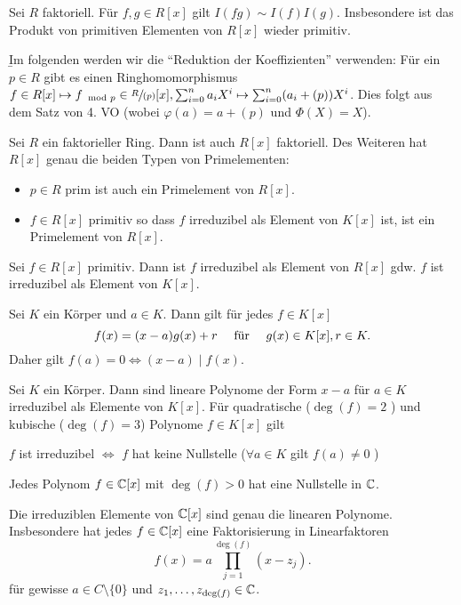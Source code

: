 \begin{proposition}[Gauss]
	Sei $R$ faktoriell. Für $f,g \in R[x]$ gilt $I(fg) \sim I(f) I(g)$.
	Insbesondere ist das Produkt von primitiven Elementen von $R[x]$ wieder primitiv.
\end{proposition}

\b
Im folgenden werden wir die \enquote{Reduktion der Koeffizienten} verwenden:
Für ein $p \in R$ gibt es einen Ringhomomorphismus $f \in R[x] \mapsto f_{\mod p} \in \sfrac{R}{(p)}[x], \sum_{i=0}^{n} a_{i} X^{i} \mapsto \sum_{i=0}^{n} (a_{i} + (p)) X^{i}$.
Dies folgt aus dem Satz von 4. VO %
(wobei $\varphi(a) = a + (p)$ und $\Phi(X) = X$).


\begin{theorem}[Gauss]
	Sei $R$ ein faktorieller Ring. Dann ist auch $R[x]$ faktoriell.
	Des Weiteren hat $R[x]$ genau die beiden Typen von Primelementen:
	\begin{itemize}
		\item $p \in R$ prim ist auch ein Primelement von $R[x]$.
		\item $f \in R[x]$ primitiv so dass $f$ irreduzibel als Element von $K[x]$ ist,
			ist ein Primelement von $R[x]$.
	\end{itemize}
\end{theorem}

\begin{corollary}
	Sei $f \in R[x]$ primitiv. Dann ist $f$ irreduzibel als Element von $R[x]$ gdw. $f$ ist irreduzibel als Element von $K[x]$.
\end{corollary}


\begin{lemma}
	Sei $K$ ein Körper und $a \in K$. Dann gilt für jedes $f \in K[x]$ 
	\[
		f(x) = (x-a)g(x) + r \qq{ für } g(x) \in K[x], r \in K
	.\]
	Daher gilt $f(a) = 0 \Leftrightarrow (x-a) \mid f(x)$.
\end{lemma}

\begin{proposition}
	Sei $K$ ein Körper. Dann sind lineare Polynome der Form $x-a$ für $a \in K$ irreduzibel als Elemente von $K[x]$.
	Für quadratische ($\deg(f) = 2$ ) und kubische ($\deg(f) = 3$) Polynome  $f \in K[x]$ gilt
	\begin{center}
		$f$ ist irreduzibel $\Leftrightarrow$ $f$ hat keine Nullstelle ($\forall a \in K$ gilt $f(a) \neq 0$ )
	\end{center}
\end{proposition}


\begin{theorem}
	Jedes Polynom $f \in \mathbb{C}[x]$ mit $\deg(f) > 0$ hat eine Nullstelle in $\mathbb{C}$.

	Die irreduziblen Elemente von $\mathbb{C}[x]$ sind genau die linearen Polynome.
	Insbesondere hat jedes $f \in \mathbb{C}[x]$ eine Faktorisierung in Linearfaktoren
	\[
		f(x) = a \prod_{j=1}^{\deg(f)} (x-z_{j})
	.\] 
	für gewisse $a \in C \setminus \{0\}$ und $z_1,\ldots,z_{\deg(f)} \in \mathbb{C}$.
\end{theorem}

